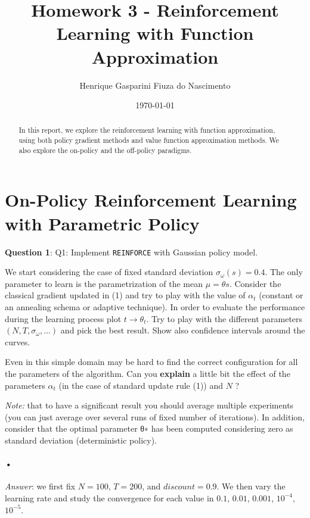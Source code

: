 \documentclass[a4paper]{article}
\title{Homework 3 - Reinforcement Learning with Function Approximation}
\author{Henrique Gasparini Fiuza do Nascimento}
\date{\today}
\begin{document}
\maketitle

\begin{abstract}

In this report, we explore the reinforcement learning with function approximation, using both policy gradient methods and value function approximation methods. We also explore the on-policy and the off-policy paradigms.

\end{abstract}

\section{On-Policy Reinforcement Learning with Parametric Policy}
\label{sec:first_exercise}

\textbf{Question 1}: Q1: Implement \texttt{REINFORCE} with Gaussian policy model.

We start considering the case of fixed standard deviation $\sigma_{\omega}(s) = 0.4$. The only parameter to learn is the parametrization of the mean $\mu = \theta s$. Consider the classical gradient updated in (1) and try to play with the value of $\alpha_t$ (constant or an annealing schema or adaptive technique). In order to evaluate the performance during the learning process plot $t \rightarrow \theta_t$. Try to play with the different parameters $(N , T , \sigma_{\omega} , . . .)$ and pick the best result. Show also confidence intervals around the curves.

Even in this simple domain may be hard to find the correct configuration for all the parameters of the algorithm. Can you \textbf{explain} a little bit the effect of the parameters $\alpha_t$ (in the case of standard update rule (1)) and $N$ ?

\textit{Note:} that to have a significant result you should average multiple experiments (you can just average over several runs of fixed number of iterations). In addition, consider that the optimal parameter θ∗ has been computed considering zero as standard deviation (deterministic policy).

\paragraph{•}
\textit{Answer}: we first fix $N = 100$, $T = 200$, and $discount = 0.9$. We then vary the learning rate and study the convergence for each value in $0.1$, $0.01$, $0.001$, $10^{-4}$, $10^{-5}$.
\end{document}
